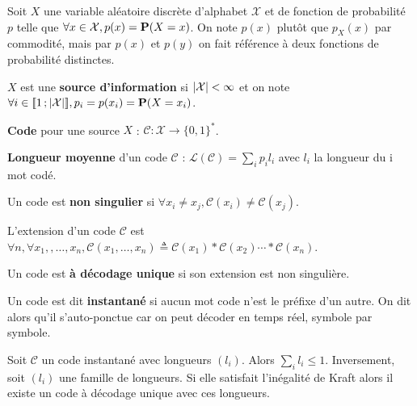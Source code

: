 Soit $X$ une variable aléatoire discrète d'alphabet $\mathcal{X}$ et de fonction de probabilité $p$ telle que $\forall x \in \mathcal{X}, p(x) = \mathbf{P}(X = x)$.
On note $p(x)$ plutôt que $p_X(x)$ par commodité, mais par $p(x)$ et $p(y)$ on fait référence à deux fonctions de probabilité distinctes.

\begin{defn}
	$X$ est une \textbf{source d'information} si $\left\lvert\mathcal{X}\right\rvert < \infty$ et on note $\forall i \in \mathopen{[\![}1\mathclose{}\mathpunct{};\left\lvert\mathcal{X}\right\rvert\mathclose{]\!]}, p_i = p(x_i) = \mathbf{P}(X = x_i)$.
\end{defn}

\begin{defn}
	\textbf{Code} pour une source $X$ : $\mathcal{C} \colon \mathcal{X} \to \{ 0,1 \}^*$.
\end{defn}

\begin{defn}
	\textbf{Longueur moyenne} d'un code $\mathcal{C}$ : $\mathcal{L}(\mathcal{C}) = \sum_i p_i l_i$ avec $l_i$ la longueur du i mot codé.
\end{defn}

\begin{defn}
	Un code est \textbf{non singulier} si $\forall x_i \neq x_j, \mathcal{C}(x_i) \neq \mathcal{C}(x_j)$.
\end{defn}

\begin{defn}
	L'extension d'un code $\mathcal{C}$ est $\forall n, \forall x_1,, \ldots, x_n, \mathcal{C}(x_1, \ldots, x_n) \triangleq \mathcal{C}(x_1) * \mathcal{C}(x_2) \cdots * \mathcal{C}(x_n)$.
\end{defn}

\begin{defn}
	Un code est \textbf{à décodage unique} si son extension est non singulière.
\end{defn}

\begin{defn}
	Un code est dit \textbf{instantané} si aucun mot code n'est le préfixe d'un autre.
	On dit alors qu'il s'auto-ponctue car on peut décoder en temps réel, symbole par symbole.
\end{defn}

\begin{thm}
	Soit $\mathcal{C}$ un code instantané avec longueurs $(l_i)$.
	Alors $\sum_i l_i \leq 1$.
	Inversement, soit $(l_i)$ une famille de longueurs.
	Si elle satisfait l'inégalité de Kraft alors il existe un code à décodage unique avec ces longueurs.
\end{thm}

